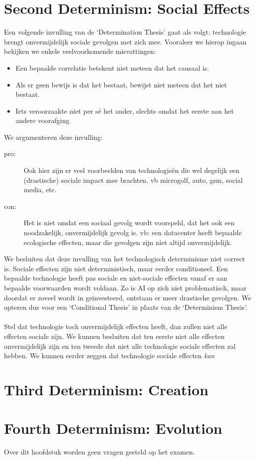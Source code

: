 \documentclass[../summary.tex]{subfiles}
\begin{document}
	\section{Second Determinism: Social Effects}
	Een volgende invulling van de `Determination Thesis' gaat als volgt: technologie brengt onvermijdelijk sociale gevolgen met zich mee. Vooraleer we hierop ingaan bekijken we enkele veelvoorkomende misvattingen:
	\begin{itemize}
		\item Een bepaalde correlatie betekent niet meteen dat het causaal is.
		\item Als er geen bewijs is dat het bestaat, bewijst niet meteen dat het niet bestaat.
		\item Iets veroorzaakte niet per sé het ander, slechts omdat het eerste aan het andere voorafging.
	\end{itemize}
	We argumenteren deze invulling:
	\begin{description}
		\item[pro:] Ook hier zijn er veel voorbeelden van technologieën die wel degelijk een (drastische) sociale impact mee brachten. vb microgolf, auto, gsm, social media, etc.
		\item[con:] Het is niet omdat een sociaal gevolg wordt voorspeld, dat het ook een noodzakelijk, onvermijdelijk gevolg is. vb: een datacenter heeft bepaalde ecologische effecten, maar die gevolgen zijn niet altijd onvermijdelijk. 
	\end{description}
	We besluiten dat deze invulling van het technologisch determinisme niet correct is. Sociale effecten zijn niet deterministisch, maar eerder conditioneel. Een bepaalde technologie heeft pas sociale en niet-sociale effecten vanaf er aan bepaalde voorwaarden wordt voldaan. Zo is AI op zich niet problematisch, maar doordat er zoveel wordt in geïnvesteerd, ontstaan er meer drastische gevolgen. We opteren dus voor een `Conditional Thesis' in plaats van de `Determinism Thesis'.\\
	\\
	Stel dat technologie toch onvermijdelijk effecten heeft, dan zullen niet alle effecten sociale zijn. We kunnen besluiten dat ten eerste niet alle effecten onvermijdelijk zijn en ten tweede dat niet alle technologie sociale effecten zal hebben. We kunnen eerder zeggen dat technologie sociale effecten \emph{kan}  
	
	\section{Third Determinism: Creation}
	
	\section{Fourth Determinism: Evolution}
	Over dit hoofdstuk worden geen vragen gesteld op het examen.
		
\end{document}
